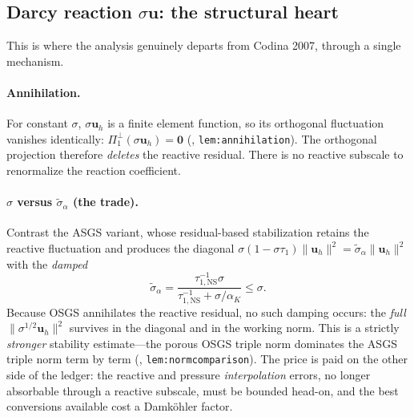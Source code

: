 \documentclass[11pt]{article}
\theoremstyle{remark}
\newcommand{\bu}{\boldsymbol{u}}
\newcommand{\bze}{\boldsymbol{0}}
\newcommand{\norm}[1]{\lVert #1 \rVert}
\newcommand{\tns}{\tau_{1,\mathrm{NS}}}
\newcommand{\sigmatilde}{\widetilde{\sigma}_{\alpha}}
\newcommand{\Poneo}{\Pi_{1}^{\perp}}
\begin{document}
\subsection{Darcy reaction \texorpdfstring{$\sigma\bu$}{sigma u}: the structural heart}
\label{sec:reaction}

This is where the analysis genuinely departs from Codina 2007, through a single mechanism.

\paragraph{Annihilation.} For constant $\sigma$, $\sigma\bu_h$ is a finite element function,
so its orthogonal fluctuation vanishes identically: $\Poneo(\sigma\bu_h)=\bze$
(\cite{osgsnote}, \texttt{lem:annihilation}). The orthogonal projection therefore
\emph{deletes} the reactive residual. There is no reactive subscale to renormalize the
reaction coefficient.

\paragraph{$\sigma$ versus $\sigmatilde$ (the trade).} Contrast the ASGS variant, whose
residual-based stabilization retains the reactive fluctuation and produces the diagonal
$\sigma(1-\sigma\tau_1)\norm{\bu_h}^2=\sigmatilde\norm{\bu_h}^2$ with the \emph{damped}
\[
  \sigmatilde=\frac{\tns^{-1}\sigma}{\tns^{-1}+\sigma/\alpha_K}\le\sigma .
\]
Because OSGS annihilates the reactive residual, no such damping occurs: the \emph{full}
$\norm{\sigma^{1/2}\bu_h}^2$ survives in the diagonal and in the working norm. This is a
strictly \emph{stronger} stability estimate---the porous OSGS triple norm dominates the ASGS
triple norm term by term (\cite{osgsnote}, \texttt{lem:normcomparison}). The price is paid
on the other side of the ledger: the reactive and pressure \emph{interpolation} errors, no
longer absorbable through a reactive subscale, must be bounded head-on, and the best
conversions available cost a Damk\"ohler factor.
\end{document}
